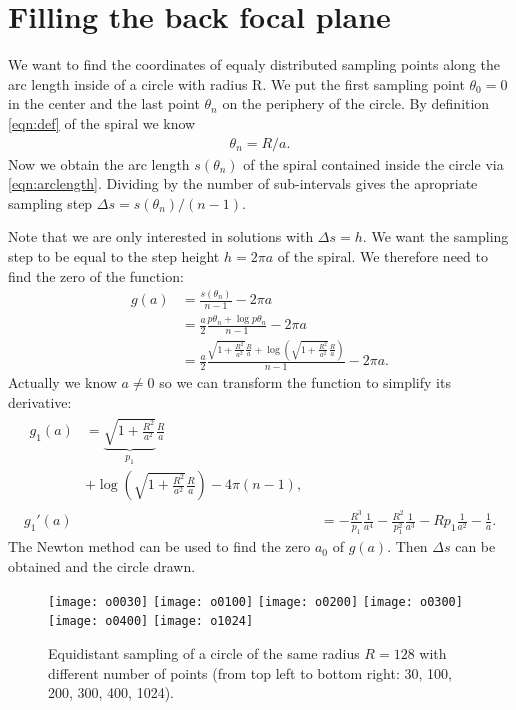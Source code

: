 \documentclass[twocolumn,DIV18]{scrartcl}
\renewcommand{\(}{\left(}
\renewcommand{\)}{\right)}
\begin{document}
\section{Filling the back focal plane}
We want to find the coordinates of equaly distributed sampling points
along the arc length inside of a circle with radius R. We put the
first sampling point $\theta_0=0$ in the center and the last point
$\theta_n$ on the periphery of the circle. By definition
\eqref{eqn:def} of the spiral we know
\begin{align}
  \theta_n=R/a.
\end{align}
Now we obtain the arc length $s(\theta_n)$ of the spiral contained
inside the circle via \eqref{eqn:arclength}. Dividing by the number of
sub-intervals gives the apropriate sampling step $\Delta s =
s(\theta_n)/(n-1)$.

Note that we are only interested in solutions with $\Delta s=h$. We
want the sampling step to be equal to the step height $h=2\pi a$ of
the spiral. We therefore need to find the zero of the function:
\begin{align} \label{eqn:g}
  g(a)&=\frac{s(\theta_n)}{n-1}-2\pi a\\
  &=\frac{a}{2}\frac{p\theta_n+\log p\theta_n}{n-1}-2\pi a\\
  &=\frac{a}{2}\frac{\sqrt{1+\frac{R^2}{a^2}}\frac{R}{a}+
    \log\(\sqrt{1+\frac{R^2}{a^2}}\frac{R}{a}\)}{n-1}-2\pi a.
\end{align}
Actually we know $a\not =0$ so we can transform the function to
simplify its derivative:
\begin{align} \label{eqn:g1}
\begin{split}
  g_1(a)&=\underbrace{\sqrt{1+\frac{R^2}{a^2}}}_{p_1}\frac{R}{a}\\ 
  &+\log\(\sqrt{1+\frac{R^2}{a^2}}\frac{R}{a}\)-4\pi (n-1),\end{split}\\
  g_1'(a)&=-\frac{R^3}{p_1}\frac{1}{a^4}-\frac{R^2}{p_1^2}\frac{1}{a^3}-R
    p_1\frac{1}{a^2}-\frac{1}{a}.
\end{align}
The Newton method can be used to find the zero $a_0$ of $g(a)$. Then
$\Delta s$ can be obtained and the circle drawn.

\begin{figure}[h]
  \begin{center}
    \texttt{[image: o0030]}
    \texttt{[image: o0100]}
    \texttt{[image: o0200]}
    \texttt{[image: o0300]}
    \texttt{[image: o0400]}
    \texttt{[image: o1024]}
  \end{center}
  \caption{Equidistant sampling of a circle of the same radius
    $R=128$ with different number of points (from top left to bottom
    right: 30, 100, 200, 300, 400, 1024).}
\end{figure}
\end{document}
